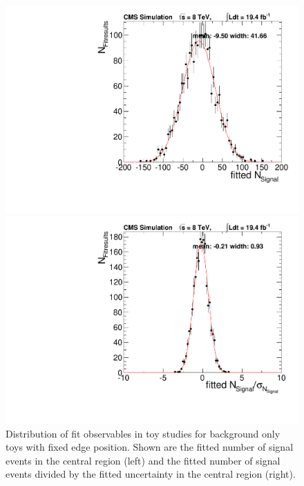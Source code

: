 \begin{figure}[hbp]
  \centering
  \begin{minipage}[t]{0.49\textwidth}
    \includegraphics[width=\textwidth]{plots/results/fit/nSPure_backgroundOnly_Fixedm078.pdf}
  \end{minipage}
  \begin{minipage}[t]{0.49\textwidth}
    \includegraphics[width=\textwidth]{plots/results/fit/nS_backgroundOnly_Fixedm078.pdf}
  \end{minipage}

  \caption{Distribution of fit observables in toy studies for background only toys with fixed edge position. Shown are the fitted number of signal events in the central region (left) and the fitted number of signal events divided by the fitted uncertainty in the central region (right).}
  \label{fig:toys:backgroundOnlyFixed}
\end{figure}
